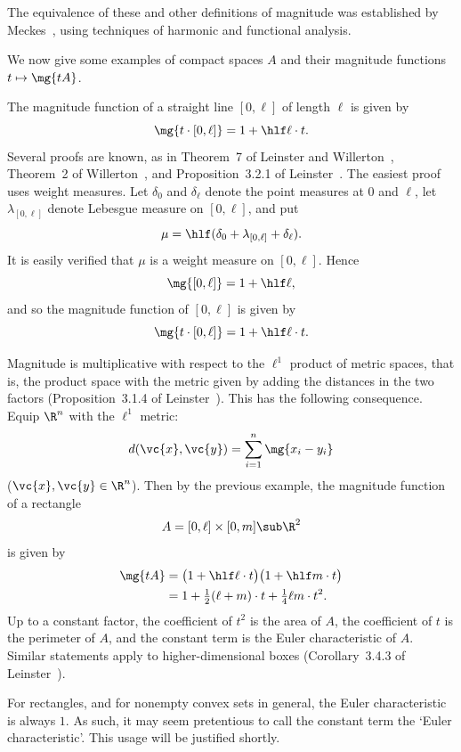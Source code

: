 The equivalence of these and other definitions of magnitude was established
by Meckes~\cite{MeckPDM,MeckMDC},%
%
% 
using techniques of harmonic and functional analysis.

We now give some examples of compact spaces $A$ and their magnitude
functions $t \mapsto \mg{tA}$.

\begin{example}
The magnitude function of a straight line $[0, \ell]$ of length $\ell$ is
given by 
\[
\mg{t \cdot [0, \ell]} = 1 + \hlf\ell\cdot t.
\]
Several proofs are known, as in Theorem~7 of Leinster and
Willerton~\cite{AMSES},%
%
% 
Theorem~2 of Willerton~\cite{WillMSS}, and Proposition~3.2.1 of
Leinster~\cite{MMS}.  The easiest proof uses weight measures.  Let
$\delta_0$ and $\delta_\ell$ denote the point measures at $0$ and $\ell$,
let $\lambda_{[0, \ell]}$ denote Lebesgue measure on $[0, \ell]$, and put
\[
\mu = \hlf(\delta_0 + \lambda_{[0, \ell]} + \delta_\ell).
\]
It is easily verified that $\mu$ is a weight measure on $[0, \ell]$.  Hence
\[
\mg{[0, \ell]} = 1 + \hlf\ell,
\]
and so the magnitude function of $[0, \ell]$ is given by 
\[
\mg{t \cdot [0, \ell]} 
=
1 + \hlf\ell\cdot t.
\]
\end{example}

\begin{example}
% 
Magnitude is multiplicative with respect to the $\ell^1$%
% 
% 
product of metric
spaces, that is, the product space with the metric given by adding the
distances in the two factors (Proposition~3.1.4 of Leinster~\cite{MMS}).
This has the following consequence.  Equip $\R^n$ with the $\ell^1$ metric:
\[
d(\vc{x}, \vc{y}) = \sum_{i = 1}^n \mg{x_i - y_i}
\]
($\vc{x}, \vc{y} \in \R^n$).  Then by the previous example, the magnitude
function of a rectangle 
\[
A = [0, \ell] \times [0, m] \sub \R^2
\]
is given by
% 
\begin{align*}
\mg{tA} &
=
\bigl( 1 + \hlf\ell\cdot t \bigr) 
\bigl( 1 + \hlf m\cdot t \bigr)         \\
&
=
1 + \tfrac{1}{2} (\ell + m) \cdot t 
+ \tfrac{1}{4} \ell m \cdot t^2.
\end{align*}
% 
Up to a constant factor, the coefficient of $t^2$ is the area of $A$, the
coefficient of $t$ is the perimeter of $A$, and the constant term is the
Euler characteristic of $A$.  Similar statements apply to
higher-dimensional boxes (Corollary~3.4.3 of Leinster~\cite{MMS}).

For rectangles, and for nonempty convex sets in general, the Euler
characteristic is always $1$.  As such, it may seem pretentious to call the
constant term the `Euler characteristic'.  This usage will be justified
shortly.
\end{example}

